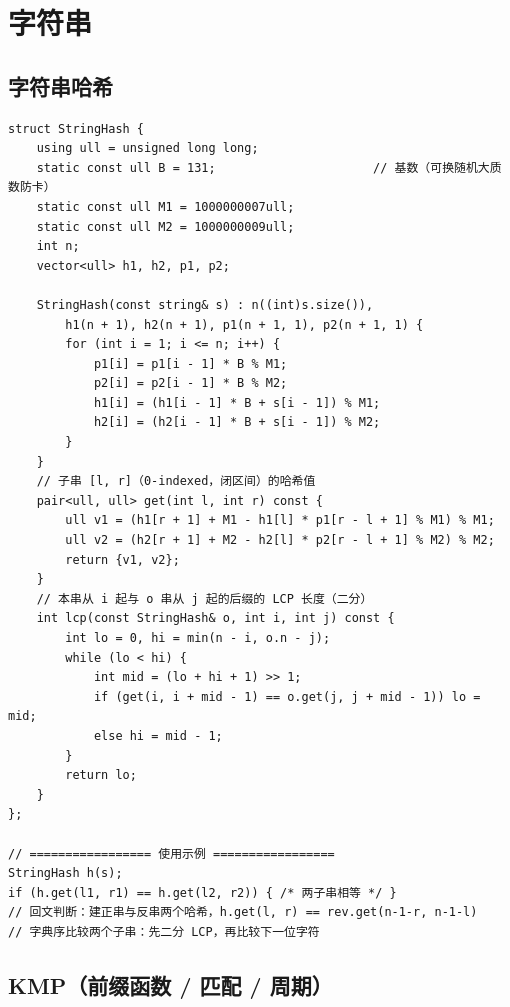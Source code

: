 \section{字符串}

\subsection{字符串哈希}

\begin{lstlisting}
struct StringHash {
    using ull = unsigned long long;
    static const ull B = 131;                      // 基数（可换随机大质数防卡）
    static const ull M1 = 1000000007ull;
    static const ull M2 = 1000000009ull;
    int n;
    vector<ull> h1, h2, p1, p2;

    StringHash(const string& s) : n((int)s.size()),
        h1(n + 1), h2(n + 1), p1(n + 1, 1), p2(n + 1, 1) {
        for (int i = 1; i <= n; i++) {
            p1[i] = p1[i - 1] * B % M1;
            p2[i] = p2[i - 1] * B % M2;
            h1[i] = (h1[i - 1] * B + s[i - 1]) % M1;
            h2[i] = (h2[i - 1] * B + s[i - 1]) % M2;
        }
    }
    // 子串 [l, r]（0-indexed，闭区间）的哈希值
    pair<ull, ull> get(int l, int r) const {
        ull v1 = (h1[r + 1] + M1 - h1[l] * p1[r - l + 1] % M1) % M1;
        ull v2 = (h2[r + 1] + M2 - h2[l] * p2[r - l + 1] % M2) % M2;
        return {v1, v2};
    }
    // 本串从 i 起与 o 串从 j 起的后缀的 LCP 长度（二分）
    int lcp(const StringHash& o, int i, int j) const {
        int lo = 0, hi = min(n - i, o.n - j);
        while (lo < hi) {
            int mid = (lo + hi + 1) >> 1;
            if (get(i, i + mid - 1) == o.get(j, j + mid - 1)) lo = mid;
            else hi = mid - 1;
        }
        return lo;
    }
};

// ================= 使用示例 =================
StringHash h(s);
if (h.get(l1, r1) == h.get(l2, r2)) { /* 两子串相等 */ }
// 回文判断：建正串与反串两个哈希，h.get(l, r) == rev.get(n-1-r, n-1-l)
// 字典序比较两个子串：先二分 LCP，再比较下一位字符
\end{lstlisting}

\subsection{KMP（前缀函数 / 匹配 / 周期）}


